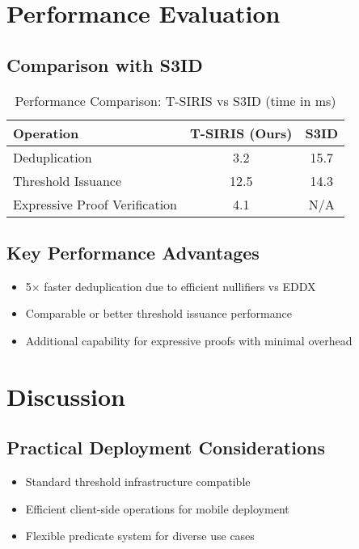 \section{Performance Evaluation}
\label{sec:threshold-performance}

\subsection{Comparison with S3ID}
\begin{table}[h]
    \centering
    \caption{Performance Comparison: T-SIRIS vs S3ID (time in ms)}
    \begin{tabular}{lcc}
        \toprule
        \textbf{Operation} & \textbf{T-SIRIS (Ours)} & \textbf{S3ID} \\
        \midrule
        Deduplication & 3.2 & 15.7 \\
        Threshold Issuance & 12.5 & 14.3 \\
        Expressive Proof Verification & 4.1 & N/A \\
        \bottomrule
    \end{tabular}
\end{table}

\subsection{Key Performance Advantages}
\begin{itemize}
    \item 5× faster deduplication due to efficient nullifiers vs EDDX
    \item Comparable or better threshold issuance performance
    \item Additional capability for expressive proofs with minimal overhead
\end{itemize}

\section{Discussion}
\label{sec:threshold-discussion}

\subsection{Practical Deployment Considerations}
\begin{itemize}
    \item Standard threshold infrastructure compatible
    \item Efficient client-side operations for mobile deployment
    \item Flexible predicate system for diverse use cases
\end{itemize}

